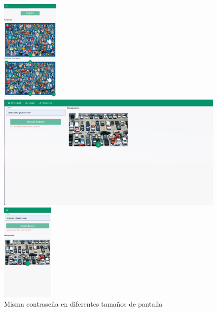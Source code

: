\begin{anexos}
\begin{figure}
\begin{minipage}[hb]{\linewidth}
\begin{minipage}[b]{0.6\linewidth}
	\end{minipage}%
	\hfill
	\begin{minipage}[b]{0.3\linewidth} %
		\centering
		\includegraphics[width=0.5\linewidth,height=5cm]{Graphics/capturas/password-mobile.png}
		
	\end{minipage}
	
	
	\caption{Misma contrase\~na en diferentes tama\~nos de pantalla }
	\label{screen-shapes-variety}
	\end{minipage}

\begin{minipage}[hb]{\linewidth}
		\centering
\begin{minipage}[hb]{0.6\linewidth}  %
	\centering
	\includegraphics[width=\linewidth]{Graphics/capturas/cars-login-error-landscape.png}
	
\end{minipage}%
\hfill
\begin{minipage}[hb][0.3\linewidth]{0.2\linewidth} %
	\centering
	\includegraphics[width=0.7\linewidth,height=4.8cm]{Graphics/capturas/login-error-mobile.png}
	

\end{minipage}
\end{minipage}
\end{figure}
\end{anexos}

